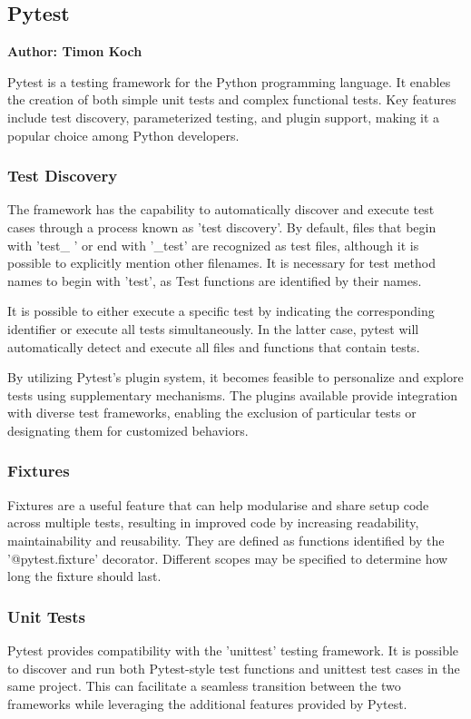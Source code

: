 \subsection{Pytest}
\textbf{Author: Timon Koch}

Pytest is a testing framework for the Python programming language. It enables the creation of both simple unit tests and complex functional tests. Key features include test discovery, parameterized testing, and plugin support, making it a popular choice among Python developers. 
 
\subsubsection{Test Discovery}
The framework has the capability to automatically discover and execute test cases through a process known as 'test discovery'. By default, files that begin with 'test\_ ' or end with '\_test' are recognized as test files, although it is possible to explicitly mention other filenames. It is necessary for test method names to begin with 'test', as Test functions are identified by their names.

It is possible to either execute a specific test by indicating the corresponding identifier or execute all tests simultaneously. In the latter case, pytest will automatically detect and execute all files and functions that contain tests.  

By utilizing Pytest's plugin system, it becomes feasible to personalize and explore tests using supplementary mechanisms. The plugins available provide integration with diverse test frameworks, enabling the exclusion of particular tests or designating them for customized behaviors.

\subsubsection{Fixtures}
Fixtures are a useful feature that can help modularise and share setup code across multiple tests, resulting in improved code by increasing readability, maintainability and reusability.
They are defined as functions identified by the '@pytest.fixture' decorator. Different scopes may be specified to determine how long the fixture should last.

\subsubsection{Unit Tests}
Pytest provides compatibility with the 'unittest' testing framework. It is possible to discover and run both Pytest-style test functions and unittest test cases in the same project. This can facilitate a seamless transition between the two frameworks while leveraging the additional features provided by Pytest.

